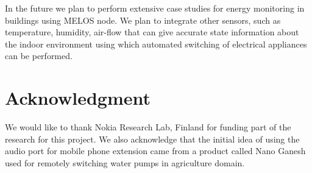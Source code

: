 \documentclass[10pt]{sigplan-proc-varsize}
\newcommand{\melos}{MELOS }
\begin{document}
In the future we plan to perform extensive case studies for energy monitoring in buildings using \melos node. We plan to integrate other sensors, such as temperature, humidity, air-flow that can give accurate state information about the indoor environment using which automated switching of electrical appliances can be performed.

\section{Acknowledgment}
We would like to thank Nokia Research Lab, Finland for funding part of the research for this project. We also acknowledge that the initial idea of using the audio port for mobile phone extension came from a product called Nano Ganesh used for remotely switching water pumps in agriculture domain.



\end{document}
